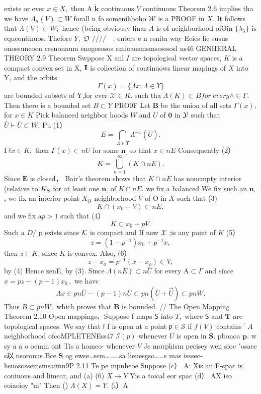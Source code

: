 exists or ever $x\in X,$ then A $\dot{\boldsymbol{k}}$ continuous ${\mathbf{}}V$ continuous Theorem 2.6 implies tha we have $\Lambda_{n}(V)\subset W$ forall n fo somenihboho $\mathcal{W}$ is a PROOF in $X.$ It follows that $\Lambda(V)\subset{\bar{W}};$ hence (being obviousy linar $\Lambda$ is of neighborhood ofOin $\{\lambda_{\lambda}\}$ is equcontinuos. Thefore $\textstyle Y,$ ${\mathfrak{O}}$ ${\slash/}{\slash/}\quad.$ enters e n esnita way Eeies lie susus onossuneoen cesnonaum enogesosos amioaosmsmsesesosl ns46 GENHERAL THEORY 2.9 Theorem Swppose X anl $\boldsymbol{\mathit{I}}$ are topological vector spaces, $\textstyle K$ is a compact convex set in X, ${\bf I}$ is collection of continuows linear mapings of $\textstyle X$ into Y, and the orbits $$ \Gamma(x)=\{\Lambda x\colon\Lambda\in\Upsilon\} $$ are bounded subsets of Y,for ever $\textstyle{\mathcal{X}}\in K.$ such tha $\Lambda(K)\subset B f o r\ e v e r y\wedge\in\Gamma.$ Then there is a bounded set $B\subset Y$ PRO0F Let $\boldsymbol{B}$ be the union of all sets $\Gamma(x),$ for $x\in K$ Pick balanced neighbor hoods $\textstyle W$ and $U$ of $\mathbf{0}$ in ${\cal{Y}}$ such that $\bar{U}\vdash\bar{U}\subset W.$ Pu (1） $$ E=\bigcap_{\Lambda\in\Upsilon}\Lambda^{-1}({\bar{U}}). $$ I $\textsf{f}x\in K,$ then $\Gamma(x)\subset n U$ for some ${\boldsymbol{n}}_{\mathrm{{,}}}$ so that $x\in n E$ Consequently (2） $$ K=\bigcup_{n=1}^{\infty}(K\cap n E). $$ Since ${\boldsymbol{E}}$ is closed， Bair's theorem shows that $K\cap n E$ has noncmpty interior (relative to $K_{\mathrm{\scriptsize{S}}}$ for at least one ${\boldsymbol{n}}.$ of $K\cap n E.$ we fix a balanced We fix such an ${\boldsymbol{n}}_{\cdot}$ , we fix an interior point $X_{\mathrm{O}}$ neighborhood ${\mathbf{}}V$ of O in $\textstyle X$ such that (3) $$ K\cap(x_{0}+V)\subset n E, $$ and we fix ${\textrm{a}}p>1$ such that (4） $$ K\subset x_{0}+p V. $$ Such a $D\!\!\!\!/$ p exists since ${\cal K}$ is compact and If now $\textstyle{\mathcal{X}}$ ;is any point of $\textstyle K$ (5） $$ z=(1-p^{-1})x_{0}+p^{-1}x, $$ then $z\in K.$ since $K$ is convex. Also, (6） $$ z-x_{\mathrm{o}}=p^{-1}(x-x_{\mathrm{o}})\in V, $$ by (4) Hence zenE, by (3). Since $\Lambda(n E)\subset n\bar{U}$ for every $\mathrm{A}\subset\Gamma$ and since $x=p z-(p-1)x_{0}\,,$ we havc $$ \Lambda x\in p n\overline{{{U}}}-(p-1)n\overline{{{U}}}\subset p n(\overline{{{U}}}+\overrightarrow{U})\subset p n W. $$ Thus $B\subset p n W;$ which proves that $\boldsymbol{B}$ is bounded. // The Open Mapping Theorem 2.10 Open mappings、Suppose f maps $\boldsymbol{\mathsf{S}}$ into $T,$ where $\boldsymbol{\mathsf{S}}$ and ${\boldsymbol{T}}$ are topological spaces. We say that ${\boldsymbol{\mathsf{f}}}$ f is open at a point ${\mathfrak{p}}\in{\mathcal{S}}$ if $f(V)$ contains $^{'}\!\!\ A$ neighborhood ofcoMPLETENEss47 ${\mathcal{I}}(p)$ whenever $U$ is open in ${\boldsymbol{S}}.$ pbonoa ${\boldsymbol{p}}.$ w sy a a o ocmm ont Tis a homeo- whenever ${\mathbf{}}V$ Je morphism pecisey wen sioe "osaec s以.nsoronus Bce $\mathbf{S}$ og ewse…ssm………sa lieuesgso……s mas issseo- hsuosossemsmsaimn9P 2.11 Te pe mpnheoe Suppose (c） A: Xis an F-spac is coniuous and limear, and (a) (6) $X\to Y$ Yis a toical eor spac (d） AX iso eoiaeioy "m" Then () $\Lambda(X)=Y.$ (i）A 
